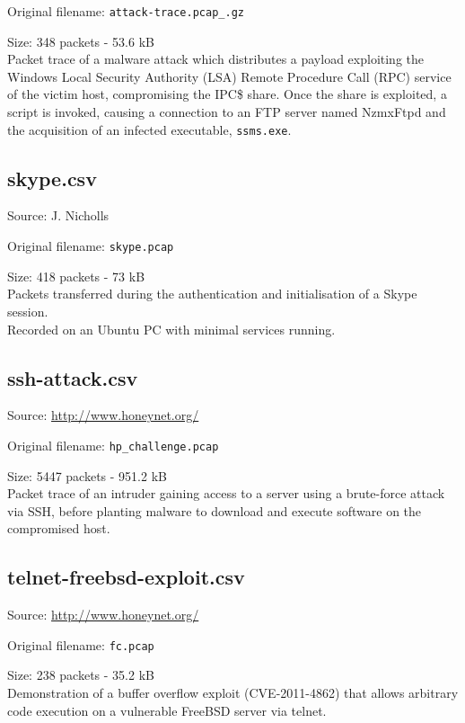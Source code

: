 \documentclass[12pt,a4paper]{article}
\newcommand{\dbl}{\\[\baselineskip]}
\begin{document}
            Original filename: \verb!attack-trace.pcap_.gz!

            Size: 348 packets - 53.6 kB\dbl
            Packet trace of a malware attack which distributes a
            payload exploiting the Windows Local Security Authority
            (LSA) Remote Procedure Call (RPC) service of the victim
            host, compromising the IPC\$ share. Once the share is
            exploited, a script is invoked, causing a connection to an
            FTP server named NzmxFtpd and the acquisition of an
            infected executable, \verb!ssms.exe!.

        \subsection{skype.csv}
            Source: J. Nicholls

            Original filename: \verb|skype.pcap|

            Size: 418 packets - 73 kB\dbl
            Packets transferred during the authentication and
            initialisation of a Skype session.\\ Recorded on an Ubuntu
            PC with minimal services running.

        \subsection{ssh-attack.csv}
            Source: \url{http://www.honeynet.org/}

            Original filename: \verb|hp_challenge.pcap|

            Size: 5447 packets - 951.2 kB\dbl
            Packet trace of an intruder gaining access to a server
            using a brute-force attack via SSH, before planting malware
            to download and execute software on the compromised host.

        \subsection{telnet-freebsd-exploit.csv}
            Source: \url{http://www.honeynet.org/}

            Original filename: \verb|fc.pcap|

            Size: 238 packets - 35.2 kB\dbl
            Demonstration of a buffer overflow exploit (CVE-2011-4862)
            that allows arbitrary code execution on a vulnerable
            FreeBSD server via telnet.
\end{document}
